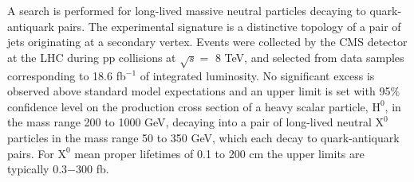 A search is performed for long-lived massive neutral particles decaying
 to quark-antiquark pairs. The experimental signature is a distinctive topology of a pair of jets originating at a
 secondary vertex.
 Events were collected by the CMS detector at the LHC during pp collisions at $\sqrt{s}=$ 8 TeV, and selected from data samples corresponding to 18.6 fb$^{-1}$ of integrated luminosity. No significant excess
 is observed above standard model expectations and an upper limit is set with 95$\%$ confidence level
 on the production cross section of a heavy scalar particle,
  $\text{H}^0$, in the mass range 200 to 1000 GeV, decaying into a pair of long-lived neutral $\text{X}^0$
   particles in the mass
   range 50 to 350 GeV, which each decay to quark-antiquark pairs. For $\text{X}^0$ mean proper lifetimes
   of 0.1 to 200 cm
    the upper limits are typically 0.3$-$300 fb.
